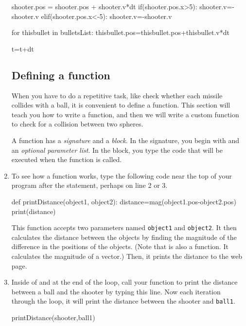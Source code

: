 \begin{enumerate}
\begin{myvpython}
    shooter.pos = shooter.pos + shooter.v*dt
    if(shooter.pos.x>5):
        shooter.v=-shooter.v
    elif(shooter.pos.x<-5):
        shooter.v=-shooter.v

    for thisbullet in bulletsList:
        thisbullet.pos=thisbullet.pos+thisbullet.v*dt

    t=t+dt
\end{myvpython}
		

\subsection*{Defining a function}

When you have to do a repetitive task, like check whether each missile collides with a ball, it is convenient to define a function. This section will teach you how to write a function, and then we will write a custom function to check for a collision between two spheres.

A function has a \emph{signature} and a \emph{block}.  In the signature, you begin with  and an \emph{optional parameter list}. In the block, you type the code that will be executed when the function is called.  

\item To see how a function works, type the following code near the top of your program after the  statement, perhaps on line 2 or 3.

\begin{myvpython}
def printDistance(object1, object2):
    distance=mag(object1.pos-object2.pos)
    print(distance)
\end{myvpython}

This function accepts two parameters named \texttt{object1} and \texttt{object2}.  It then calculates the distance between the objects by finding the magnitude of the difference in the positions of the objects. (Note that  is also a function. It calculates the magnitude of a vector.) Then, it prints the distance to the web page.

\item Inside of and at the end of the  loop, call your function to print the distance between a ball and the shooter by typing this line. Now each iteration through the loop, it will print the distance between the shooter and \texttt{ball1}.

\begin{myvpython}
    printDistance(shooter,ball1)
\end{myvpython}


\end{enumerate}

